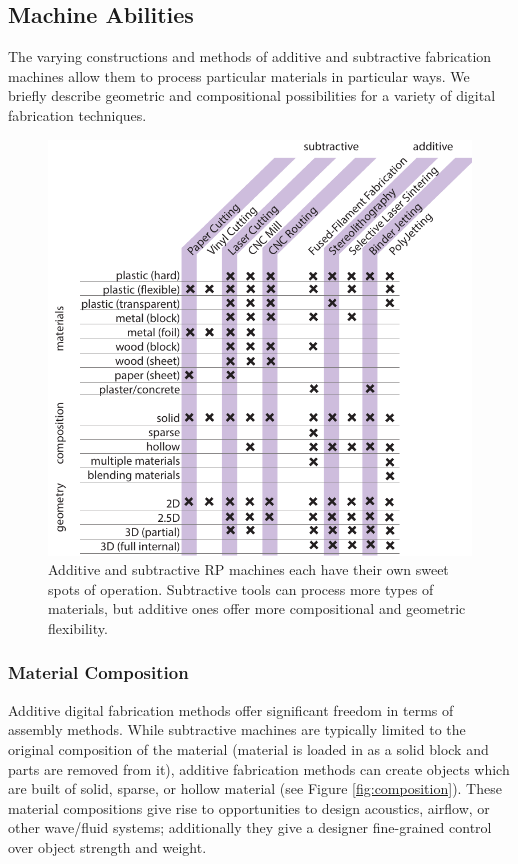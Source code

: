 \subsection{Machine Abilities}

The varying constructions and methods of additive and subtractive fabrication machines allow them to process particular materials in particular ways. We briefly describe geometric and compositional possibilities for a variety of digital fabrication techniques.

\begin{figure}
\centering
\includegraphics[width=5in]{figures/materials-machines.pdf}
\caption{Additive and subtractive RP machines each have their own sweet spots of operation. Subtractive tools can process more types of materials, but additive ones offer more compositional and geometric flexibility.}
\label{table:materials-machines}
\end{figure}

\subsubsection{Material Composition}

Additive digital fabrication methods offer significant freedom in terms of assembly methods. While subtractive machines are typically limited to the original composition of the material (material is loaded in as a solid block and parts are removed from it), additive fabrication methods can create objects which are built of solid, sparse, or hollow material (see Figure \ref{fig:composition}). These material compositions give rise to opportunities to design acoustics, airflow, or other wave/fluid systems; additionally they give a designer fine-grained control over object strength and weight.

